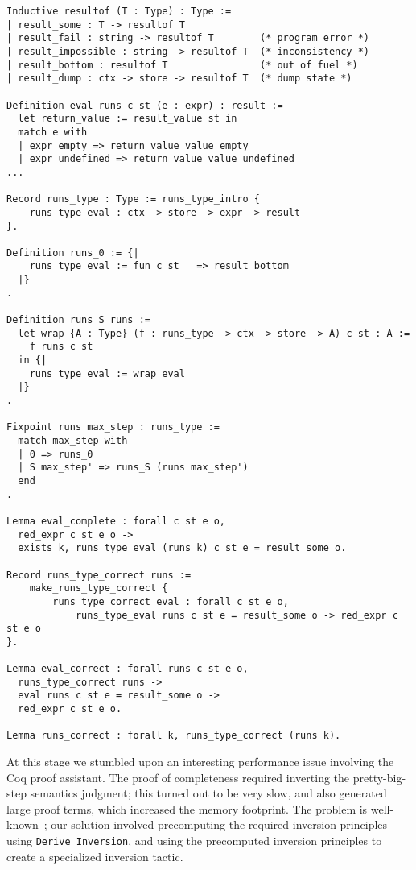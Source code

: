 \documentclass{llncs}
\newcommand{\asi}[1]{\todo[color=green,inline]{#1}}
\begin{document}
\begin{verbatim}
Inductive resultof (T : Type) : Type :=
| result_some : T -> resultof T
| result_fail : string -> resultof T        (* program error *)
| result_impossible : string -> resultof T  (* inconsistency *)
| result_bottom : resultof T                (* out of fuel *)
| result_dump : ctx -> store -> resultof T  (* dump state *)

Definition eval runs c st (e : expr) : result :=
  let return_value := result_value st in
  match e with
  | expr_empty => return_value value_empty
  | expr_undefined => return_value value_undefined
...

Record runs_type : Type := runs_type_intro {
    runs_type_eval : ctx -> store -> expr -> result
}.

Definition runs_0 := {|
    runs_type_eval := fun c st _ => result_bottom
  |}
.

Definition runs_S runs := 
  let wrap {A : Type} (f : runs_type -> ctx -> store -> A) c st : A :=
    f runs c st
  in {|
    runs_type_eval := wrap eval
  |}
.

Fixpoint runs max_step : runs_type :=
  match max_step with
  | 0 => runs_0
  | S max_step' => runs_S (runs max_step')
  end
.

Lemma eval_complete : forall c st e o,
  red_expr c st e o -> 
  exists k, runs_type_eval (runs k) c st e = result_some o.

Record runs_type_correct runs :=
    make_runs_type_correct {
        runs_type_correct_eval : forall c st e o,
            runs_type_eval runs c st e = result_some o -> red_expr c st e o
}.

Lemma eval_correct : forall runs c st e o,
  runs_type_correct runs -> 
  eval runs c st e = result_some o ->
  red_expr c st e o.

Lemma runs_correct : forall k, runs_type_correct (runs k). 
\end{verbatim}

\asi{Add the theorem.}

At this stage we stumbled upon an interesting performance issue 
involving the Coq proof assistant. The proof of completeness required
inverting the pretty-big-step semantics judgment; this turned out
to be very slow, and also generated large proof terms, which increased
the memory footprint. The problem is well-known~\citep{Monin:Coq2}; 
our solution involved
precomputing the required inversion principles using
\texttt{Derive Inversion}, and using the precomputed inversion
principles to create a specialized inversion tactic.
\end{document}
